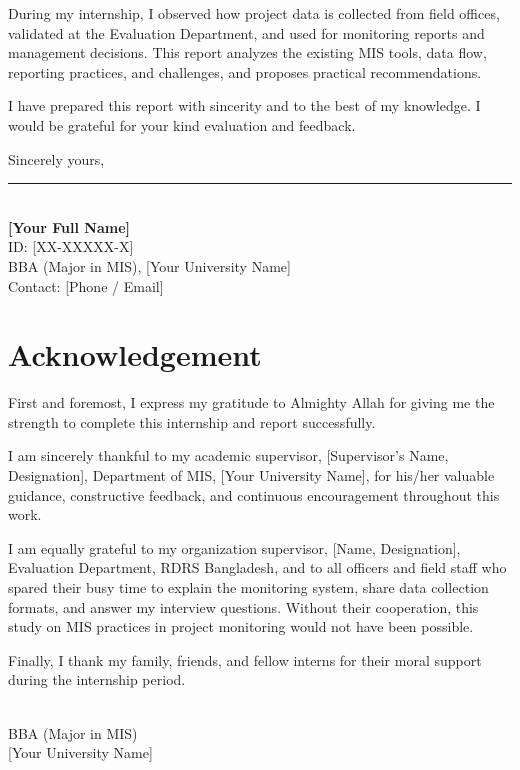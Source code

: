 \documentclass[12pt,a4paper]{report}
\begin{document}
During my internship, I observed how project data is collected from field
offices, validated at the Evaluation Department, and used for monitoring
reports and management decisions. This report analyzes the existing MIS
tools, data flow, reporting practices, and challenges, and proposes
practical recommendations.

I have prepared this report with sincerity and to the best of my
knowledge. I would be grateful for your kind evaluation and feedback.

\vspace{12pt}
\noindent
Sincerely yours,\\[24pt]
\rule{2.5in}{0.5pt}\\
\textbf{[Your Full Name]}\\
ID: [XX-XXXXX-X]\\
BBA (Major in MIS), [Your University Name]\\
Contact: [Phone / Email] %
\newpage

\chapter*{Acknowledgement}

First and foremost, I express my gratitude to Almighty Allah for giving me
the strength to complete this internship and report successfully.

I am sincerely thankful to my academic supervisor, [Supervisor's Name,
Designation], Department of MIS, [Your University Name], for his/her
valuable guidance, constructive feedback, and continuous encouragement
throughout this work.

I am equally grateful to my organization supervisor, [Name, Designation],
Evaluation Department, RDRS Bangladesh, and to all officers and field
staff who spared their busy time to explain the monitoring system,
share data collection formats, and answer my interview questions. Without
their cooperation, this study on MIS practices in project monitoring
would not have been possible.

Finally, I thank my family, friends, and fellow interns for their moral
support during the internship period.

\vspace{12pt}
\\
BBA (Major in MIS)\\[2pt]
[Your University Name]
\newpage
\end{document}
